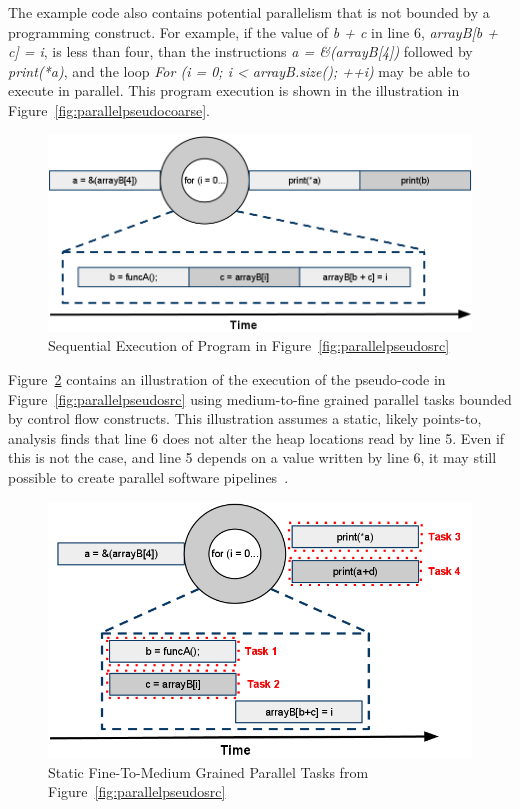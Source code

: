 \documentclass[defaultstyle,11pt]{thesis}
\begin{document}
The example code also contains potential parallelism that is not
bounded by a programming construct.  For example, if the value of
\textit{b + c} in line 6, \textit{arrayB[b + c] = i}, is less than
four, than the instructions \textit{ a = \&(arrayB[4])} followed by
\textit{print(*a)}, and the loop \textit{For (i = 0; i <
  arrayB.size(); ++i)} may be able to execute in parallel.  This
program execution is shown in the illustration in
Figure~\ref{fig:parallelpseudocoarse}.

\begin{figure}
\begin{center}
\includegraphics[width=6in]{images/ParallelTasksSequential}
\end{center}
\caption{Sequential Execution of Program in Figure~\ref{fig:parallelpseudosrc}}
\label{fig:parallelpseudoseq}
\end{figure}

Figure~\ref{fig:parallelpseudomedcntl} contains an illustration of
the execution of the pseudo-code in Figure~\ref{fig:parallelpseudosrc}
using medium-to-fine grained parallel tasks bounded by control flow
constructs.  This illustration assumes a static, likely points-to,
analysis finds that line 6 does not alter the heap locations read by
line 5.  Even if this is not the case, and line 5 depends on a value
written by line 6, it may still possible to create parallel software
pipelines~\cite{rangan:04:pact, giacomoni:08:ppopp}.

\begin{figure}
\begin{center}
\includegraphics[width=5in]{images/ParallelTasksMedControl}
\end{center}
\caption{Static Fine-To-Medium Grained Parallel Tasks from Figure~\ref{fig:parallelpseudosrc}}
\label{fig:parallelpseudomedcntl}
\end{figure}
\end{document}
